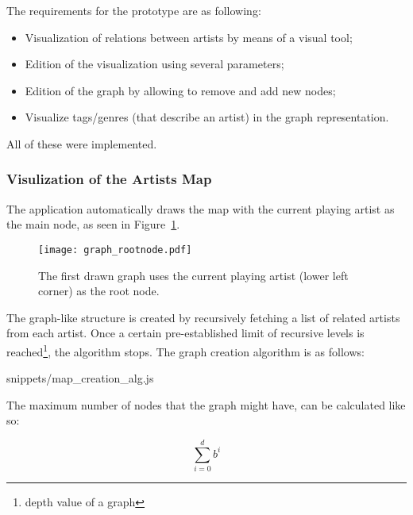     The requirements for the prototype are as following:

    \begin{itemize}
      \item Visualization of relations between artists by means of a visual tool;
      \item Edition of the visualization using several parameters;
      \item Edition of the graph by allowing to remove and add new nodes;
      \item Visualize tags/genres (that describe an artist) in the graph representation.
    \end{itemize}

    All of these were implemented.

    \subsubsection{Visulization of the Artists Map} %
      \label{ssub:visualization}
    
      The application automatically draws the map with the current playing artist as the main node, as seen in Figure~\ref{fig:graph_rootnode}.

      \begin{figure}[H]
        \begin{center}
          \texttt{[image: graph\_rootnode.pdf]}
        \end{center}
        \caption{The first drawn graph uses the current playing artist (lower left corner) as the root node.}
        \label{fig:graph_rootnode}
      \end{figure}

      The graph-like structure is created by recursively fetching a list of related artists from each artist. Once a certain pre-established limit of recursive levels is reached\footnote{depth value of a graph}, the algorithm stops.
      The graph creation algorithm is as follows:

      
      {snippets/map_creation_alg.js}

      The maximum number of nodes that the graph might have, can be calculated like so:

      \begin{equation}
          \sum_{i=0}^{d} b ^ i
      \end{equation}

